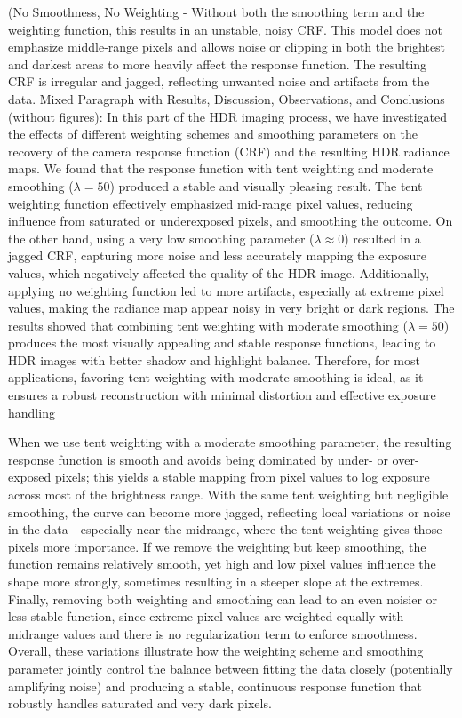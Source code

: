 \documentclass[a4paper,10pt]{article}
\begin{document}
(No Smoothness, No Weighting - Without both the smoothing term and the weighting function, 
this results in an unstable, noisy CRF. This model does not emphasize middle-range pixels and allows
 noise or clipping in both the brightest and darkest areas to more heavily affect the response function. 
 The resulting CRF is irregular and jagged, reflecting unwanted noise and artifacts from the data. 
Mixed Paragraph with Results, Discussion, Observations, and Conclusions (without figures): 
 In this part of the HDR imaging process, we have investigated the effects of different weighting 
 schemes and smoothing parameters on the recovery of the camera response function (CRF) and the resulting
  HDR radiance maps. We found that the response function with tent weighting and moderate smoothing 
  (\(\lambda = 50\)) produced a stable and visually pleasing result. The tent weighting function effectively
   emphasized mid-range pixel values, reducing influence from saturated or underexposed pixels, and 
   smoothing the outcome. On the other hand, using a very low smoothing parameter (\(\lambda \approx 0\)) 
   resulted in a jagged CRF, capturing more noise and less accurately mapping the exposure values, which 
   negatively affected the quality of the HDR image. Additionally, applying no weighting function led to 
   more artifacts, especially at extreme pixel values, making the radiance map appear noisy in very 
   bright or dark regions. The results showed that combining tent weighting with moderate smoothing
   (\(\lambda = 50\)) produces the most visually appealing and stable response functions, leading to
    HDR images with better shadow and highlight balance. Therefore, for most applications, 
    favoring tent weighting with moderate smoothing is ideal, as it ensures a robust reconstruction 
    with minimal distortion and effective exposure handling

When we use tent weighting with a moderate smoothing parameter, 
the resulting response function is smooth and avoids being dominated 
by under- or over-exposed pixels; this yields a stable mapping from pixel values 
to log exposure across most of the brightness range. With the same tent weighting but negligible
 smoothing, the curve can become more jagged, reflecting local variations or noise in the data—especially 
 near the midrange, where the tent weighting gives those pixels more importance. If we remove the weighting 
 but keep smoothing, the function remains relatively smooth, yet high and low pixel values influence the shape 
 more strongly, sometimes resulting in a steeper slope at the extremes. Finally, removing both weighting and 
 smoothing can lead to an even noisier or less stable function, since extreme pixel values are weighted
  equally with midrange values and there is no regularization term to enforce smoothness. Overall, 
  these variations illustrate how the weighting scheme and smoothing parameter jointly control the 
  balance between fitting the data closely (potentially amplifying noise) and producing a stable,
  continuous response function that robustly handles saturated and very dark pixels.
\end{document}
